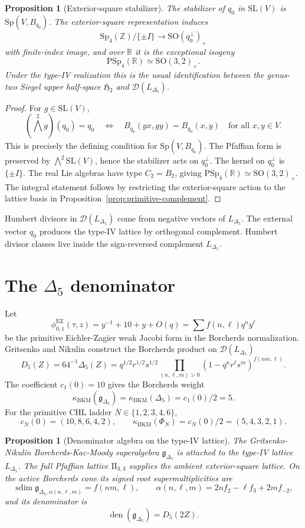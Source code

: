 \documentclass[11pt]{article}
\providecommand{\Z}{\mathbb{Z}}
\providecommand{\R}{\mathbb{R}}
\providecommand{\SO}{\mathrm{SO}}
\providecommand{\SL}{\mathrm{SL}}
\providecommand{\Sp}{\mathrm{Sp}}
\providecommand{\PSp}{\mathrm{PSp}}
\providecommand{\II}{\mathrm{II}}
\providecommand{\kBKM}{\kappa_{\mathrm{BKM}}}
\providecommand{\Dfive}{D_5}
\providecommand{\sdim}{\operatorname{sdim}}
\theoremstyle{plain}
\newtheorem{proposition}[theorem]{Proposition}
\theoremstyle{definition}
\begin{document}
\begin{proposition}[Exterior-square stabilizer]
\label{prop:stabilizer-sp4}
The stabilizer of $q_0$ in $\SL(V)$ is $\Sp(V,B_{q_0})$.  The
exterior-square representation induces
\[
\Sp_4(\Z)/\{\pm I\}\longrightarrow \SO(q_0^\perp)_+
\]
with finite-index image, and over $\R$ it is the exceptional isogeny
\[
\PSp_4(\R)\simeq \SO(3,2)_+ .
\]
Under the type-IV realization this is the usual identification between
the genus-two Siegel upper half-space $\mathfrak H_2$ and
\(\mathcal D(L_{\Delta_5})\).
\end{proposition}

\begin{proof}
For $g\in\SL(V)$,
\[
(\bigwedge^2 g)(q_0)=q_0
\quad\Longleftrightarrow\quad
B_{q_0}(gx,gy)=B_{q_0}(x,y)\quad\text{for all }x,y\in V.
\]
This is precisely the defining condition for $\Sp(V,B_{q_0})$.  The
Pfaffian form is preserved by $\bigwedge^2\SL(V)$, hence the
stabilizer acts on $q_0^\perp$.  The kernel on $q_0^\perp$ is
$\{\pm I\}$.  The real Lie algebras have type $C_2=B_2$, giving
$\PSp_4(\R)\simeq\SO(3,2)_+$.  The integral statement follows by
restricting the exterior-square action to the lattice basis in
Proposition~\ref{prop:primitive-complement}.
\end{proof}

Humbert divisors in $\mathcal D(L_{\Delta_5})$ come from negative
vectors of $L_{\Delta_5}$.  The external vector $q_0$ produces the
type-IV lattice by orthogonal complement.  Humbert divisor classes live
inside the sign-reversed complement \(L_{\Delta_5}\).

\section{\texorpdfstring{The $\Delta_5$ denominator}{The Delta5 denominator}}

Let
\[
\phi_{0,1}^{\mathrm{EZ}}(\tau,z)
=y^{-1}+10+y+O(q)
=\sum f(n,\ell)q^ny^\ell
\]
be the primitive Eichler-Zagier weak Jacobi form in the Borcherds
normalization.  Gritsenko and Nikulin construct the Borcherds product
on $\mathcal D(L_{\Delta_5})$
\[
\Dfive(Z)=64^{-1}\Delta_5(Z)
=q^{1/2}r^{1/2}s^{1/2}
\prod_{(n,\ell,m)>0}
(1-q^nr^\ell s^m)^{f(nm,\ell)} .
\]
The coefficient $c_1(0)=10$ gives the Borcherds weight
\[
\kBKM(\mathfrak g_{\Delta_5})
=\kBKM(\Delta_5)=c_1(0)/2=5.
\]
For the primitive CHL ladder
$N\in\{1,2,3,4,6\}$,
\[
c_N(0)=(10,8,6,4,2),\qquad
\kBKM(\Phi_N)=c_N(0)/2=(5,4,3,2,1).
\]

\begin{proposition}[Denominator algebra on the type-IV lattice]
\label{prop:delta5-denominator}
The Gritsenko-Nikulin Borcherds-Kac-Moody superalgebra
$\mathfrak g_{\Delta_5}$ is attached to the type-IV lattice
$L_{\Delta_5}$.  The full Pfaffian lattice $\II_{3,3}$ supplies the
ambient exterior-square lattice.  On the active Borcherds cone its
signed root supermultiplicities are
\[
\sdim \mathfrak g_{\Delta_5,\alpha(n,\ell,m)}=f(nm,\ell),
\qquad
\alpha(n,\ell,m)=2nf_2-\ell f_3+2mf_{-2},
\]
and its denominator is
\[
\operatorname{den}(\mathfrak g_{\Delta_5})=\Dfive(2Z).
\]
\end{proposition}
\end{document}

